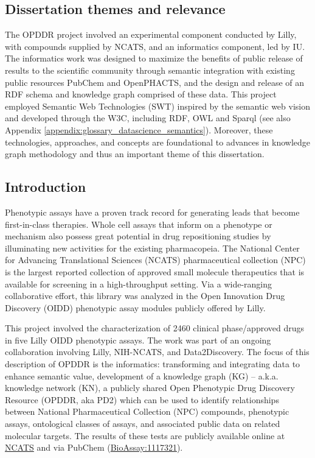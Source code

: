 \subsection{Dissertation themes and relevance}

The OPDDR project involved an experimental component conducted by Lilly, with compounds supplied by NCATS, and an informatics component, led by IU. The informatics work was designed to maximize the benefits of public release of results to the scientific community through semantic integration with existing public resources PubChem and OpenPHACTS, and the design and release of an RDF schema and knowledge graph comprised of these data. This project employed Semantic Web Technologies (SWT) inspired by the semantic web vision \cite{Berners-Lee2001-wi} and developed through the W3C, including RDF, OWL and Sparql (see also Appendix \ref{appendix:glossary_datascience_semantics}). Moreover, these technologies, approaches, and concepts are foundational to advances in knowledge graph methodology and thus an important theme of this dissertation.

\subsection{Introduction}

Phenotypic assays have a proven track record for generating leads that become first-in-class therapies. Whole cell assays that inform on a phenotype or mechanism also possess great potential in drug repositioning studies by illuminating new activities for the existing pharmacopeia. The National Center for Advancing Translational Sciences (NCATS) pharmaceutical collection (NPC) is the largest reported collection of approved small molecule therapeutics that is available for screening in a high-throughput setting. Via a wide-ranging collaborative effort, this library was analyzed in the Open Innovation Drug Discovery (OIDD) phenotypic assay modules publicly offered by Lilly. 

This project involved the characterization of 2460 clinical phase/approved drugs in five Lilly OIDD phenotypic assays. The work was part of an ongoing collaboration involving Lilly, NIH-NCATS, and Data2Discovery.  The focus of this description of OPDDR is the informatics: transforming and integrating data to enhance semantic value, development of a knowledge graph (KG) -- a.k.a. knowledge network (KN), a publicly shared Open Phenotypic Drug Discovery Resource (OPDDR, aka PD2) which can be used to identify relationships between National Pharmaceutical Collection (NPC) compounds, phenotypic assays, ontological classes of assays, and associated public data on related molecular targets. The results of these tests are publicly available online at \href{https://www.ncats.nih.gov/expertise/preclinical/pd2}{NCATS} and via PubChem (\href{https://pubchem.ncbi.nlm.nih.gov/bioassay/1117321}{BioAssay:1117321}).

